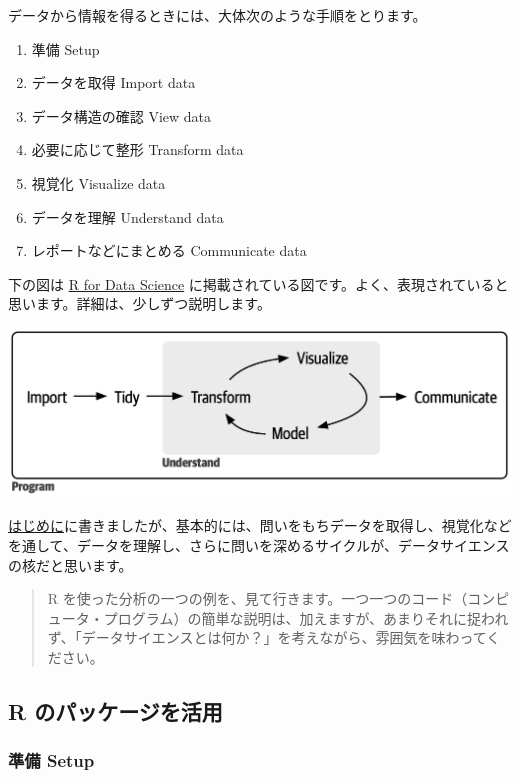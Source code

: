 \documentclass[
  xelatex, ja=standard]{bxjsbook}
\providecommand{\tightlist}{%
  \setlength{\itemsep}{0pt}\setlength{\parskip}{0pt}}
\theoremstyle{definition}
\theoremstyle{definition}
\theoremstyle{definition}
\theoremstyle{definition}
\theoremstyle{remark}
\begin{document}
データから情報を得るときには、大体次のような手順をとります。

\begin{enumerate}
\def\labelenumi{\arabic{enumi}.}
\tightlist
\item
  準備 Setup
\item
  データを取得 Import data
\item
  データ構造の確認 View data
\item
  必要に応じて整形 Transform data
\item
  視覚化 Visualize data
\item
  データを理解 Understand data
\item
  レポートなどにまとめる Communicate data
\end{enumerate}

下の図は \href{https://r4ds.hadley.nz}{R for Data Science} に掲載されている図です。よく、表現されていると思います。詳細は、少しずつ説明します。

\includegraphics[width=1\linewidth]{./data/base}

\href{https://icu-hsuzuki.github.io/ds4aj/introduction.html\#introduction}{はじめに}に書きましたが、基本的には、問いをもちデータを取得し、視覚化などを通して、データを理解し、さらに問いを深めるサイクルが、データサイエンスの核だと思います。

\begin{quote}
R を使った分析の一つの例を、見て行きます。一つ一つのコード（コンピュータ・プログラム）の簡単な説明は、加えますが、あまりそれに捉われず、「データサイエンスとは何か？」を考えながら、雰囲気を味わってください。
\end{quote}

\hypertarget{r-ux306eux30d1ux30c3ux30b1ux30fcux30b8ux3092ux6d3bux7528-1}{%
\subsection{R のパッケージを活用}\label{r-ux306eux30d1ux30c3ux30b1ux30fcux30b8ux3092ux6d3bux7528-1}}

\hypertarget{ux6e96ux5099-setup-1}{%
\subsubsection{準備 Setup}\label{ux6e96ux5099-setup-1}}
\end{document}
